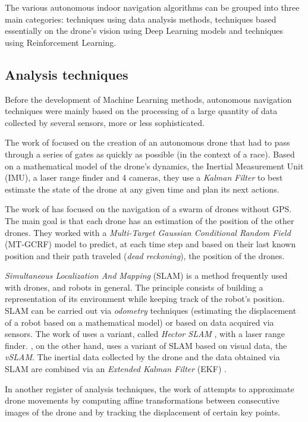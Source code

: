 The various autonomous indoor navigation algorithms can be grouped into three main categories: techniques using data analysis methods, techniques based essentially on the drone's vision using Deep Learning models and techniques using Reinforcement Learning.

\subsection{Analysis techniques}

Before the development of Machine Learning methods, autonomous navigation techniques were mainly based on the processing of a large quantity of data collected by several sensors, more or less sophisticated.

The work of \textcite{foehn2020alphapilot} focused on the creation of an autonomous drone that had to pass through a series of gates as quickly as possible (in the context of a race). Based on a mathematical model of the drone's dynamics, the Inertial Measurement Unit (IMU), a laser range finder and 4 cameras, they use a \emph{Kalman Filter} to best estimate the state of the drone at any given time and plan its next actions.

The work of \textcite{power2020autonomous} has focused on the navigation of a swarm of drones without GPS. The main goal is that each drone has an estimation of the position of the other drones. They worked with a \emph{Multi-Target Gaussian Conditional Random Field} (MT-GCRF) model to predict, at each time step and based on their last known position and their path traveled (\emph{dead reckoning}), the position of the drones.

\emph{Simultaneous Localization And Mapping} (SLAM) is a method frequently used with drones, and robots in general. The principle consists of building a representation of its environment while keeping track of the robot's position. SLAM can be carried out via \emph{odometry} techniques (estimating the displacement of a robot based on a mathematical model) or based on data acquired via sensors. The work of \textcite{nemati2015autonomous} uses a variant, called \emph{Hector SLAM} \cite{kohlbrecher2011flexible}, with a laser range finder. \textcite{brockers2014towards}, on the other hand, uses a variant of SLAM based on visual data, the \emph{vSLAM}. The inertial data collected by the drone and the data obtained via SLAM are combined via an \emph{Extended Kalman Filter} (EKF) \cite{julier1997new}.

In another register of analysis techniques, the work of \textcite{aguilar2017developing} attempts to approximate drone movements by computing affine transformations between consecutive images of the drone and by tracking the displacement of certain key points.


